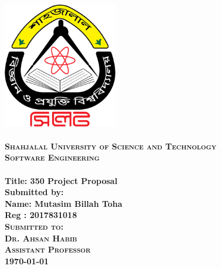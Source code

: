 \begin{titlepage}

\newcommand{\HRule}{\rule{\linewidth}{0.3mm}}
\center

\includegraphics[width=50mm]{images/sustlogo.png}\\


\textsc{\LARGE \bfseries \\ Shahjalal University of Science and Technology}\\[0.2cm] %
\textsc{\LARGE \bfseries Software Engineering}\\[0.1cm]

\Large \textbf{\\Title: 350 Project Proposal}\\[0.3cm]
\bfseries
Submitted by:\\

Name: Mutasim Billah Toha\\
Reg : 2017831018\\[0.5cm]

\textsc{Submitted to:}\\
\textsc{Dr. Ahsan Habib\\ Assistant Professor}
\\[0.4cm]

{\large \today}
\vfill
\end{titlepage}

